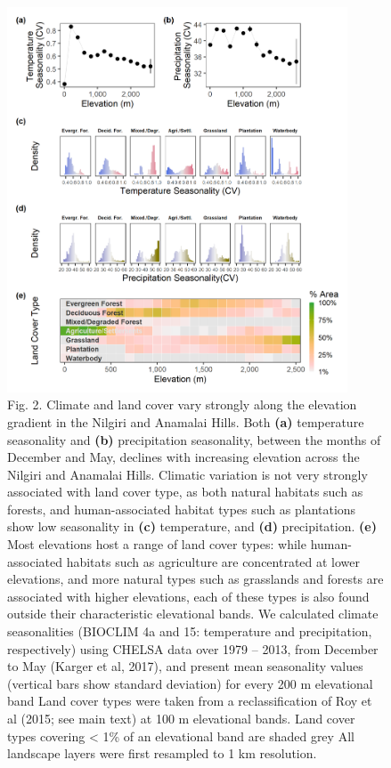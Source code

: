 \begin{figure}[t!]
    \centering
    \includegraphics[width=0.9\textwidth]{figures/hillybirds/fig_02.png}
    \caption{
        Fig. 2. Climate and land cover vary strongly along the elevation gradient in the Nilgiri and Anamalai Hills.
        Both \textbf{(a)} temperature seasonality and \textbf{(b)} precipitation seasonality, between the months of December and May, declines with increasing elevation across the Nilgiri and Anamalai Hills. 
        Climatic variation is not very strongly associated with land cover type, as both natural habitats such as forests, and human-associated habitat types such as plantations show low seasonality in \textbf{(c)} temperature, and \textbf{(d)} precipitation.
        \textbf{(e)} Most elevations host a range of land cover types: while human-associated habitats such as agriculture are concentrated at lower elevations, and more natural types such as grasslands and forests are associated with higher elevations, each of these types is also found outside their characteristic elevational bands.
        We calculated climate seasonalities (BIOCLIM 4a and 15: temperature and precipitation, respectively) using CHELSA data over 1979 -- 2013, from December to May (Karger et al, 2017), and present mean seasonality values (vertical bars show standard deviation) for every 200 m elevational band
        Land cover types were taken from a reclassification of Roy et al
        (2015; see main text) at 100 m elevational bands.
        Land cover types covering < 1\% of an elevational band are shaded grey
        All landscape layers were first resampled to 1 km resolution.
    }
    \label{hilly_fig_01}
\end{figure}

